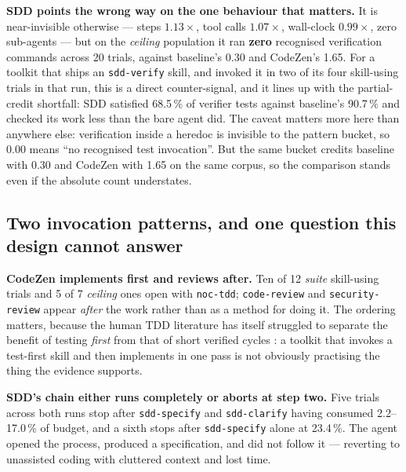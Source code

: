 \documentclass[11pt,a4paper]{article}
\newcommand{\code}[1]{\texttt{\small #1}}
\begin{document}
\textbf{SDD points the wrong way on the one behaviour that matters.} It is near-invisible
otherwise --- steps $1.13\times$, tool calls $1.07\times$, wall-clock $0.99\times$, zero
sub-agents --- but on the \emph{ceiling} population it ran \textbf{zero} recognised
verification commands across 20 trials, against baseline's 0.30 and CodeZen's 1.65. For a
toolkit that ships an \code{sdd-verify} skill, and invoked it in two of its four skill-using
trials in that run, this is a direct counter-signal, and it lines up with the partial-credit
shortfall: SDD satisfied 68.5\,\% of verifier tests against baseline's 90.7\,\% and checked
its work less than the bare agent did. The caveat matters more here than anywhere else:
verification inside a heredoc is invisible to the pattern bucket, so 0.00 means ``no
recognised test invocation''. But the same bucket credits baseline with 0.30 and CodeZen with
1.65 on the same corpus, so the comparison stands even if the absolute count understates.

\subsection{Two invocation patterns, and one question this design cannot answer}

\textbf{CodeZen implements first and reviews after.} Ten of 12 \emph{suite} skill-using trials
and 5 of 7 \emph{ceiling} ones open with \code{noc-tdd}; \code{code-review} and
\code{security-review} appear \emph{after} the work rather than as a method for doing it. The
ordering matters, because the human TDD literature has itself struggled to separate the
benefit of testing \emph{first} from that of short verified cycles
\citep{fucci2017dissection}: a toolkit that invokes a test-first skill and then implements in
one pass is not obviously practising the thing the evidence supports.

\textbf{SDD's chain either runs completely or aborts at step two.} Five trials across both
runs stop after \code{sdd-specify} and \code{sdd-clarify} having consumed 2.2--17.0\,\% of
budget, and a sixth stops after \code{sdd-specify} alone at 23.4\,\%. The agent opened the
process, produced a specification, and did not follow it --- reverting to unassisted coding
with cluttered context and lost time.
\end{document}
